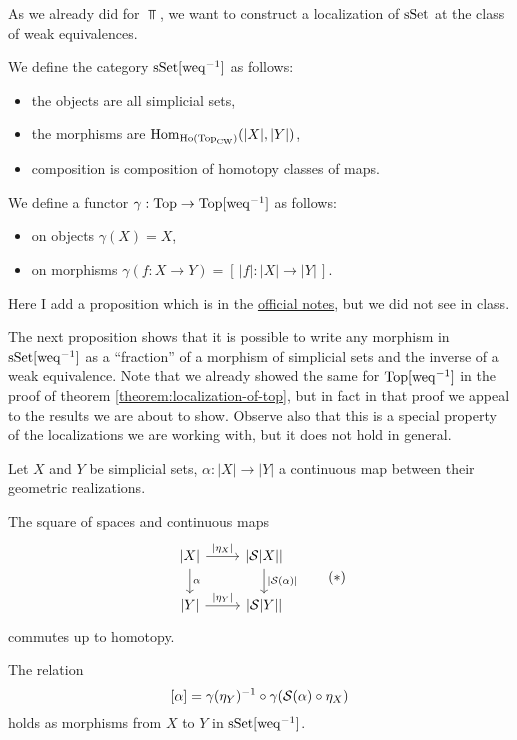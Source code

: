 As we already did for $\Top$, we want to construct a localization of ${\mathrm{sSet}}$ at the class of weak equivalences.

We define the category ${\mathrm{sSet}}[\operatorname{\,\!weq}^{-1}]$ as follows:
\begin{itemize}
    \item the objects are all simplicial sets,
    \item the morphisms are $\operatorname{Hom}_{\operatorname{Ho}({\mathrm{Top}}_\text{CW})}(|X|,|Y|)$,
    \item composition is composition of homotopy classes of maps.
\end{itemize}

We define a functor $\gamma:{\mathrm{Top}}\to{\mathrm{Top}}[\operatorname{\,\!weq}^{-1}]$ as follows:
\begin{itemize}[label={-}]
    \item on objects $\gamma(X)=X$,
    \item on morphisms $\gamma(f:X\to Y)=[\,|f|:|X|\to |Y|\,]$.
\end{itemize}

\begin{warning}
Here I add a proposition which is in the \href{https://www.math.uni-bonn.de/people/schwede/sset_vs_spaces.pdf}{official notes}, but we did not see in class.
\end{warning}

The next proposition shows that it is possible to write any morphism in ${\mathrm{sSet}}[\operatorname{\,\!weq}^{-1}]$ as a \enquote{fraction} of a morphism of simplicial sets and the inverse of a weak equivalence. Note that we already showed the same for ${\mathrm{Top}}[\operatorname{\,\!weq}^{-1}]$ in the proof of theorem \ref{theorem:localization-of-top}, but in fact in that proof we appeal to the results we are about to show. Observe also that this is a special property of the localizations we are working with, but it does not hold in general.

\begin{proposition}\label{proposition:calculus-of-fractions-in-sset}
Let $X$ and $Y$ be simplicial sets, $\alpha:|X|\to|Y|$ a continuous map between their geometric realizations.
\begin{numerate}
    \item The square of spaces and continuous maps
    \[
    \begin{tikzcd}
    {|X|} \ar[d,"\alpha"] \ar[r,"{|\eta_X|}"] & {|\S|X||} \ar[d,"{|\S(\alpha)|}"]\\
    {|Y|} \ar[r,"{|\eta_Y|}"] & {|\S|Y||}
    \end{tikzcd}\tag{$*$}
    \]
    commutes up to homotopy.
    
    \item The relation
    \[[\alpha]=\gamma(\eta_Y)^{-1}\circ\gamma(\mathcal{S}(\alpha)\circ\eta_X)\]
    holds as morphisms from $X$ to $Y$ in ${\mathrm{sSet}}[\operatorname{\,\!weq}^{-1}]$.
\end{numerate}
\end{proposition}

